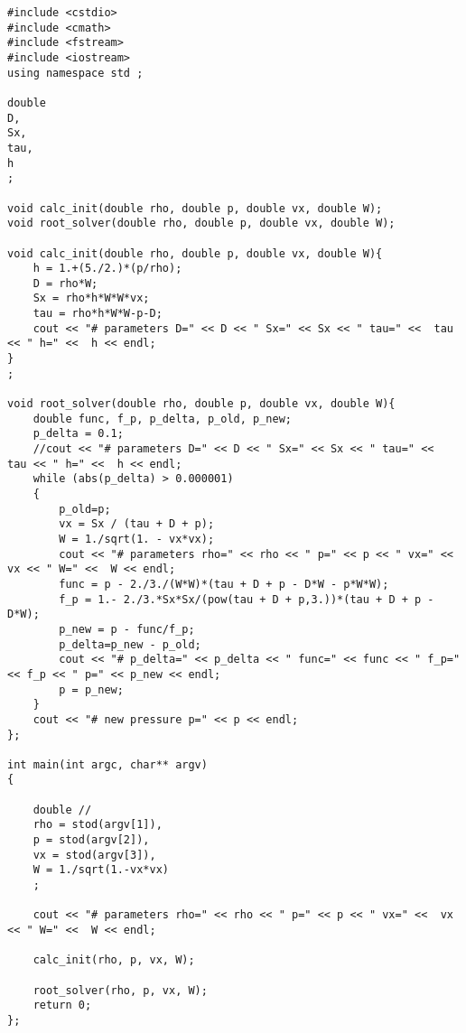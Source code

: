\documentclass[10pt,fleqn,reqno,a4paper]{article}
\begin{document}



\begin{verbatim}
#include <cstdio>
#include <cmath>
#include <fstream>
#include <iostream>
using namespace std ;

double
D,
Sx,
tau,
h
;

void calc_init(double rho, double p, double vx, double W);
void root_solver(double rho, double p, double vx, double W);

void calc_init(double rho, double p, double vx, double W){
    h = 1.+(5./2.)*(p/rho);
    D = rho*W;
    Sx = rho*h*W*W*vx;
    tau = rho*h*W*W-p-D;
    cout << "# parameters D=" << D << " Sx=" << Sx << " tau=" <<  tau << " h=" <<  h << endl;
}
;

void root_solver(double rho, double p, double vx, double W){
    double func, f_p, p_delta, p_old, p_new;
    p_delta = 0.1;
    //cout << "# parameters D=" << D << " Sx=" << Sx << " tau=" <<  tau << " h=" <<  h << endl;
    while (abs(p_delta) > 0.000001)
    {
        p_old=p;
        vx = Sx / (tau + D + p);
        W = 1./sqrt(1. - vx*vx);
        cout << "# parameters rho=" << rho << " p=" << p << " vx=" <<  vx << " W=" <<  W << endl;
        func = p - 2./3./(W*W)*(tau + D + p - D*W - p*W*W);
        f_p = 1.- 2./3.*Sx*Sx/(pow(tau + D + p,3.))*(tau + D + p - D*W);
        p_new = p - func/f_p;
        p_delta=p_new - p_old;
        cout << "# p_delta=" << p_delta << " func=" << func << " f_p=" << f_p << " p=" << p_new << endl;
        p = p_new;
    }
    cout << "# new pressure p=" << p << endl;
};

int main(int argc, char** argv)
{

    double //
    rho = stod(argv[1]),
    p = stod(argv[2]),
    vx = stod(argv[3]),
    W = 1./sqrt(1.-vx*vx)
    ;

    cout << "# parameters rho=" << rho << " p=" << p << " vx=" <<  vx << " W=" <<  W << endl;

    calc_init(rho, p, vx, W);

    root_solver(rho, p, vx, W);
	return 0;
};
\end{verbatim}
\end{document}
